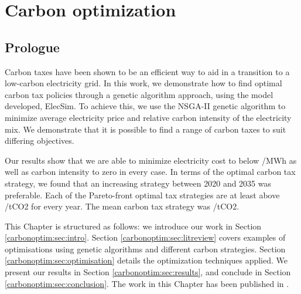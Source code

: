 \chapter{Carbon optimization}
\label{chapter:carbon}
\ifpdf
    \graphicspath{{Chapter3/Figs/Raster/}{Chapter3/Figs/PDF/}{Chapter3/Figs/}}
\else
    \graphicspath{{Chapter3/Figs/Vector/}{Chapter3/Figs/}}
\fi



\section*{Prologue}


Carbon taxes have been shown to be an efficient way to aid in a transition to a low-carbon electricity grid. In this work, we demonstrate how to find optimal carbon tax policies through a genetic algorithm approach, using the model developed, ElecSim. To achieve this, we use the NSGA-II genetic algorithm to minimize average electricity price and relative carbon intensity of the electricity mix. We demonstrate that it is possible to find a range of carbon taxes to suit differing objectives. 

Our results show that we are able to minimize electricity cost to below /MWh as well as carbon intensity to zero in every case. In terms of the optimal carbon tax strategy, we found that an increasing strategy between 2020 and 2035 was preferable. Each of the Pareto-front optimal tax strategies are at least above /tCO2 for every year. The mean carbon tax strategy was /tCO2.

This Chapter is structured as follows: we introduce our work in Section \ref{carbonoptim:sec:intro}. Section \ref{carbonoptim:sec:litreview} covers examples of optimisations using genetic algorithms and different carbon strategies. Section \ref{carbonoptim:sec:optimisation} details the optimization techniques applied. We present our results in Section \ref{carbonoptim:sec:results}, and conclude in Section \ref{carbonoptim:sec:conclusion}. The work in this Chapter has been published in \cite{Kell2020a}.

